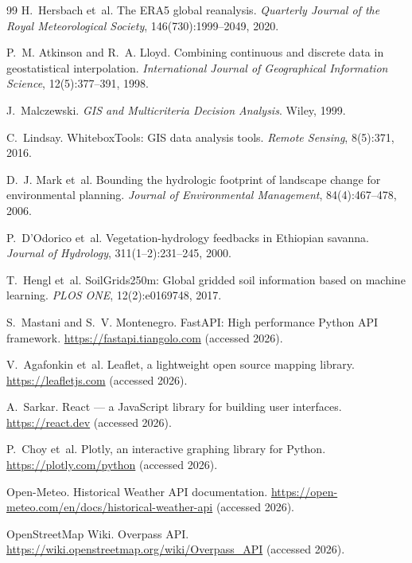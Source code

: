 \documentclass[sigconf,review,10pt]{acmart}
\begin{document}
\begin{thebibliography}{99}
H.~Hersbach et~al.
\newblock The ERA5 global reanalysis.
\newblock \emph{Quarterly Journal of the Royal Meteorological Society},
  146(730):1999--2049, 2020.

P.~M. Atkinson and R.~A. Lloyd.
\newblock Combining continuous and discrete data in geostatistical
  interpolation.
\newblock \emph{International Journal of Geographical Information
  Science}, 12(5):377--391, 1998.

J.~Malczewski.
\newblock \emph{GIS and Multicriteria Decision Analysis}.
\newblock Wiley, 1999.

C.~Lindsay.
\newblock WhiteboxTools: GIS data analysis tools.
\newblock \emph{Remote Sensing}, 8(5):371, 2016.

D.~J. Mark et~al.
\newblock Bounding the hydrologic footprint of landscape change for
  environmental planning.
\newblock \emph{Journal of Environmental Management}, 84(4):467--478,
  2006.

P.~D'Odorico et~al.
\newblock Vegetation-hydrology feedbacks in Ethiopian savanna.
\newblock \emph{Journal of Hydrology}, 311(1--2):231--245, 2000.

T.~Hengl et~al.
\newblock SoilGrids250m: Global gridded soil information based on
  machine learning.
\newblock \emph{PLOS ONE}, 12(2):e0169748, 2017.

S.~Mastani and S.~V. Montenegro.
\newblock FastAPI: High performance Python API framework.
\newblock \url{https://fastapi.tiangolo.com} (accessed 2026).

V.~Agafonkin et~al.
\newblock Leaflet, a lightweight open source mapping library.
\newblock \url{https://leafletjs.com} (accessed 2026).

A.~Sarkar.
\newblock React --- a JavaScript library for building user interfaces.
\newblock \url{https://react.dev} (accessed 2026).

P.~Choy et~al.
\newblock Plotly, an interactive graphing library for Python.
\newblock \url{https://plotly.com/python} (accessed 2026).

Open-Meteo.
\newblock Historical Weather API documentation.
\newblock \url{https://open-meteo.com/en/docs/historical-weather-api}
  (accessed 2026).

OpenStreetMap Wiki.
\newblock Overpass API.
\newblock \url{https://wiki.openstreetmap.org/wiki/Overpass_API}
  (accessed 2026).


\end{thebibliography}
\end{document}
